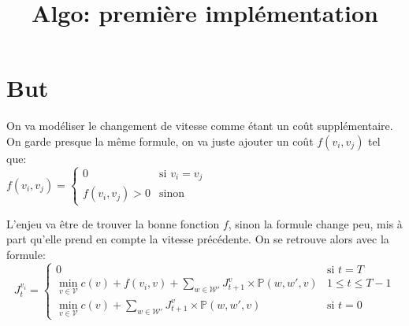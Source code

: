 \documentclass[10pt,a4paper]{article}
\title{Algo: première implémentation}
\newcommand{\W}{\mathcal{W}}
\newcommand{\V}{\mathcal{V}}
\begin{document}
\maketitle

\section{But}
On va modéliser le changement de vitesse comme étant un coût
supplémentaire. On garde presque la même formule, on va juste ajouter
un coût $f(v_i,v_j)$ tel que:\\
$f(v_i,v_j)=
\begin{cases}
  0 & \text{si } v_i=v_j \\
  f(v_i,v_j)>0 & \text{sinon}
\end{cases}
$

L'enjeu va être de trouver la bonne fonction $f$, sinon la formule
change peu, mis à part qu'elle prend en compte la vitesse
précédente. On se retrouve alors avec la formule:
\begin{equation}
  J_t^{v_i} =
  \begin{cases}
    0 & \text{si } t=T\\
    \min_{v\in\V}
    c(v)+f(v_i,v)+\sum_{w\in\W'}J_{t+1}^v\times\mathbb{P}(w,w',v) & 1\leq
    t\leq T-1\\
        \min_{v\in\V}
    c(v)+\sum_{w\in\W'}J_{t+1}^v\times\mathbb{P}(w,w',v) & \text{si }t=0

  \end{cases}
\end{equation}
\end{document}
